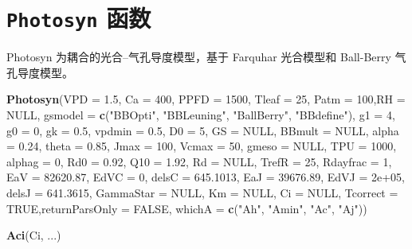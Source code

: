\documentclass[]{krantz}
\makeatletter
\newenvironment{Shaded}{\begin{snugshade}}{\end{snugshade}}
\newcommand{\KeywordTok}[1]{\textcolor[rgb]{0.13,0.29,0.53}{\textbf{#1}}}
\newcommand{\DataTypeTok}[1]{\textcolor[rgb]{0.13,0.29,0.53}{#1}}
\newcommand{\DecValTok}[1]{\textcolor[rgb]{0.00,0.00,0.81}{#1}}
\newcommand{\FloatTok}[1]{\textcolor[rgb]{0.00,0.00,0.81}{#1}}
\newcommand{\StringTok}[1]{\textcolor[rgb]{0.31,0.60,0.02}{#1}}
\newcommand{\OtherTok}[1]{\textcolor[rgb]{0.56,0.35,0.01}{#1}}
\newcommand{\NormalTok}[1]{#1}
\newenvironment{kframe}{%
\medskip{}
\setlength{\fboxsep}{.8em}
 \def\at@end@of@kframe{}%
 \ifinner\ifhmode%
  \def\at@end@of@kframe{\end{minipage}}%
  \begin{minipage}{\columnwidth}%
 \fi\fi%
 \def\FrameCommand##1{\hskip\@totalleftmargin \hskip-\fboxsep
 \colorbox{shadecolor}{##1}\hskip-\fboxsep
     \hskip-\linewidth \hskip-\@totalleftmargin \hskip\columnwidth}%
 \MakeFramed {\advance\hsize-\width
   \@totalleftmargin\z@ \linewidth\hsize
   \@setminipage}}%
 {\par\unskip\endMakeFramed%
 \at@end@of@kframe}
\renewenvironment{Shaded}{\begin{kframe}}{\end{kframe}}
\theoremstyle{definition}
\theoremstyle{definition}
\theoremstyle{definition}
\theoremstyle{remark}
\makeatother
\begin{document}
\section{\texorpdfstring{\texttt{Photosyn}
函数}{Photosyn 函数}}\label{photosyn}

Photosyn 为耦合的光合--气孔导度模型，基于 Farquhar 光合模型和 Ball-Berry
气孔导度模型。

\begin{Shaded}
\begin{Highlighting}[]
\KeywordTok{Photosyn}\NormalTok{(}\DataTypeTok{VPD =} \FloatTok{1.5}\NormalTok{, }\DataTypeTok{Ca =} \DecValTok{400}\NormalTok{, }\DataTypeTok{PPFD =} \DecValTok{1500}\NormalTok{,}
         \DataTypeTok{Tleaf =} \DecValTok{25}\NormalTok{, }\DataTypeTok{Patm =} \DecValTok{100}\NormalTok{,}\DataTypeTok{RH =} \OtherTok{NULL}\NormalTok{,}
         \DataTypeTok{gsmodel =} \KeywordTok{c}\NormalTok{(}\StringTok{"BBOpti"}\NormalTok{, }\StringTok{"BBLeuning"}\NormalTok{, }
                     \StringTok{"BallBerry"}\NormalTok{, }\StringTok{"BBdefine"}\NormalTok{),}
         \DataTypeTok{g1 =} \DecValTok{4}\NormalTok{, }\DataTypeTok{g0 =} \DecValTok{0}\NormalTok{, }\DataTypeTok{gk =} \FloatTok{0.5}\NormalTok{, }\DataTypeTok{vpdmin =} \FloatTok{0.5}\NormalTok{,}
         \DataTypeTok{D0 =} \DecValTok{5}\NormalTok{, }\DataTypeTok{GS =} \OtherTok{NULL}\NormalTok{, }\DataTypeTok{BBmult =} \OtherTok{NULL}\NormalTok{, }
         \DataTypeTok{alpha =} \FloatTok{0.24}\NormalTok{, }\DataTypeTok{theta =} \FloatTok{0.85}\NormalTok{, }\DataTypeTok{Jmax =} \DecValTok{100}\NormalTok{,}
         \DataTypeTok{Vcmax =} \DecValTok{50}\NormalTok{, }\DataTypeTok{gmeso =} \OtherTok{NULL}\NormalTok{, }\DataTypeTok{TPU =} \DecValTok{1000}\NormalTok{, }
         \DataTypeTok{alphag =} \DecValTok{0}\NormalTok{, }\DataTypeTok{Rd0 =} \FloatTok{0.92}\NormalTok{, }\DataTypeTok{Q10 =} \FloatTok{1.92}\NormalTok{,}
         \DataTypeTok{Rd =} \OtherTok{NULL}\NormalTok{, }\DataTypeTok{TrefR =} \DecValTok{25}\NormalTok{, }\DataTypeTok{Rdayfrac =} \DecValTok{1}\NormalTok{, }
         \DataTypeTok{EaV =} \FloatTok{82620.87}\NormalTok{, }\DataTypeTok{EdVC =} \DecValTok{0}\NormalTok{, }\DataTypeTok{delsC =} \FloatTok{645.1013}\NormalTok{, }
         \DataTypeTok{EaJ =} \FloatTok{39676.89}\NormalTok{, }\DataTypeTok{EdVJ =} \FloatTok{2e+05}\NormalTok{, }\DataTypeTok{delsJ =} \FloatTok{641.3615}\NormalTok{,}
         \DataTypeTok{GammaStar =} \OtherTok{NULL}\NormalTok{, }\DataTypeTok{Km =} \OtherTok{NULL}\NormalTok{, }\DataTypeTok{Ci =} \OtherTok{NULL}\NormalTok{, }
         \DataTypeTok{Tcorrect =} \OtherTok{TRUE}\NormalTok{,}\DataTypeTok{returnParsOnly =} \OtherTok{FALSE}\NormalTok{,}
         \DataTypeTok{whichA =} \KeywordTok{c}\NormalTok{(}\StringTok{"Ah"}\NormalTok{, }\StringTok{"Amin"}\NormalTok{, }\StringTok{"Ac"}\NormalTok{, }\StringTok{"Aj"}\NormalTok{))}

\KeywordTok{Aci}\NormalTok{(Ci, ...)}
\end{Highlighting}
\end{Shaded}
\end{document}
